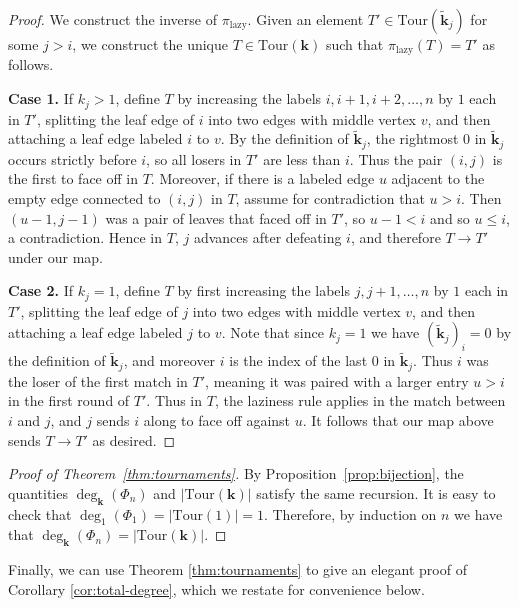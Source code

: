 \documentclass[11pt]{amsart}
\newcommand{\Tour}{\mathrm{Tour}}
\newcommand{\forget}{\pi_{\mathrm{lazy}}}
\numberwithin{thm}{section}
\numberwithin{equation}{section}
\numberwithin{figure}{section}
\theoremstyle{definition}
\begin{document}
\begin{proof}
  We construct the inverse of $\forget$.  Given an element $T'\in \Tour(\widetilde{\mathbf{k}}_j)$ for some $j>i$, we construct the unique $T\in \Tour(\mathbf{k})$ such that $\forget(T)=T'$ as follows.  
 
 \textbf{Case 1.} If $k_j> 1$, define $T$ by increasing the labels $i,i+1,i+2,\ldots,n$ by $1$ each in $T'$, splitting the leaf edge of $i$ into two edges with middle vertex $v$, and then attaching a leaf edge labeled $i$ to $v$.  By the definition of $\widetilde{\mathbf{k}}_j$, the rightmost $0$ in $\widetilde{\mathbf{k}}_j$ occurs strictly before $i$, so all losers in $T'$ are less than $i$.  Thus the pair $(i,j)$ is the first to face off in $T$.  Moreover, if there is a labeled edge $u$ adjacent to the empty edge connected to $(i,j)$ in $T$, assume for contradiction that $u>i$.  Then $(u-1,j-1)$ was a pair of leaves that faced off in $T'$, so $u-1<i$ and so $u\le i$, a contradiction.  Hence in $T$, $j$ advances after defeating $i$, and therefore $T\to T'$ under our map.
 
 \textbf{Case 2.} If $k_j=1$, define $T$ by first increasing the labels $j,j+1,\ldots,n$  by $1$ each in $T'$, splitting the leaf edge of $j$ into two edges with middle vertex $v$, and then attaching a leaf edge labeled $j$ to $v$.  Note that since $k_j=1$ we have $(\widetilde{\mathbf{k}}_j)_i=0$ by the definition of $\widetilde{\mathbf{k}}_j$, and moreover $i$ is the index of the last $0$ in $\widetilde{\mathbf{k}}_j$.  Thus $i$ was the loser of the first match in $T'$, meaning it was paired with a larger entry $u>i$ in the first round of $T'$.
 Thus in $T$, the laziness rule applies in the match between $i$ and $j$, and $j$ sends $i$ along to face off against $u$.   It follows that our map above sends $T\to T'$ as desired.
\end{proof}

\begin{proof}[Proof of Theorem~\ref{thm:tournaments}]
By Proposition~\ref{prop:bijection}, the quantities $\deg_{\mathbf{k}}(\Phi_n)$ and $|\Tour(\mathbf{k})|$ satisfy the same recursion. It is easy to check that $\deg_{1}(\Phi_1) = |\Tour(1)| = 1$. Therefore, by induction on $n$ we have that $\deg_{\mathbf{k}}(\Phi_n) = |\Tour(\mathbf{k})|$.
\end{proof}

Finally, we can use Theorem \ref{thm:tournaments} to give an elegant proof of Corollary \ref{cor:total-degree}, which we restate for convenience below.
\end{document}
